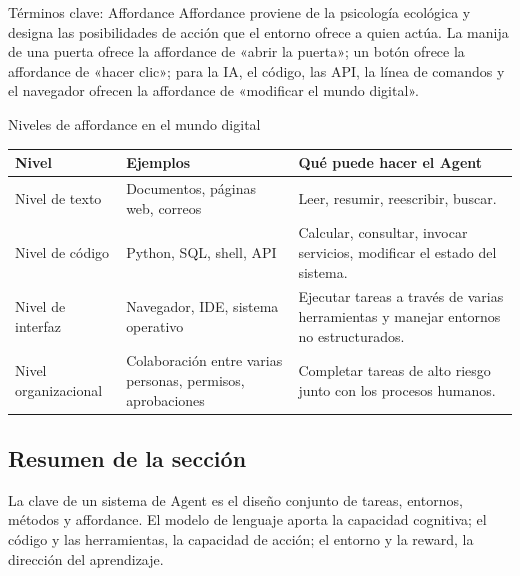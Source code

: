 \begin{knowledgebox}{Términos clave: Affordance}
Affordance proviene de la psicología ecológica y designa las posibilidades de acción que el entorno ofrece a quien actúa. La manija de una puerta ofrece la affordance de «abrir la puerta»; un botón ofrece la affordance de «hacer clic»; para la IA, el código, las API, la línea de comandos y el navegador ofrecen la affordance de «modificar el mundo digital».
\end{knowledgebox}

\begin{knowledgebox}{Niveles de affordance en el mundo digital}
\begin{tabularx}{\textwidth}{p{}p{}X}
\toprule
Nivel & Ejemplos & Qué puede hacer el Agent \\
\midrule
Nivel de texto & Documentos, páginas web, correos & Leer, resumir, reescribir, buscar. \\
Nivel de código & Python, SQL, shell, API & Calcular, consultar, invocar servicios, modificar el estado del sistema. \\
Nivel de interfaz & Navegador, IDE, sistema operativo & Ejecutar tareas a través de varias herramientas y manejar entornos no estructurados. \\
Nivel organizacional & Colaboración entre varias personas, permisos, aprobaciones & Completar tareas de alto riesgo junto con los procesos humanos. \\
\bottomrule
\end{tabularx}
\end{knowledgebox}

\subsection{Resumen de la sección}

La clave de un sistema de Agent es el diseño conjunto de tareas, entornos, métodos y affordance. El modelo de lenguaje aporta la capacidad cognitiva; el código y las herramientas, la capacidad de acción; el entorno y la reward, la dirección del aprendizaje.
